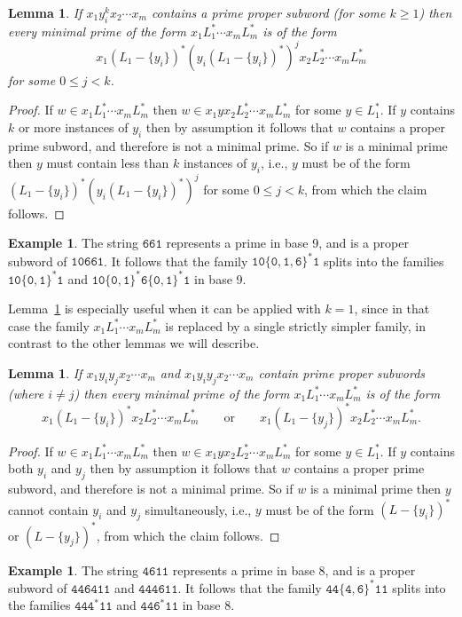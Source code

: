 \documentclass[12pt]{article}
\theoremstyle{plain}
\newtheorem{lemma}[theorem]{Lemma}
\theoremstyle{definition}
\newtheorem{example}[theorem]{Example}
\newcommand{\0}{\mathtt{0}}
\newcommand{\1}{\mathtt{1}}
\newcommand{\2}{\mathtt{2}}
\newcommand{\3}{\mathtt{3}}
\newcommand{\4}{\mathtt{4}}
\newcommand{\5}{\mathtt{5}}
\newcommand{\6}{\mathtt{6}}
\newcommand{\7}{\mathtt{7}}
\newcommand{\8}{\mathtt{8}}
\newcommand{\9}{\mathtt{9}}
\begin{document}
\begin{lemma}\label{lemsplit1}
If $x_1y_i^kx_2\dotsm x_m$ contains a prime proper subword (for some $k\geq1$) then every minimal prime of the form
$x_1L_1^*\dotsm x_mL_m^*$ is of the form \[x_1(L_1-\{y_i\})^*(y_i(L_1-\{y_i\})^*)^jx_2L_2^*\dotsm x_mL_m^*\]
for some $0\leq j<k$.
\end{lemma}
\begin{proof}
If $w\in x_1L_1^*\dotsm x_mL_m^*$ then $w\in x_1yx_2L_2^*\dotsm x_mL_m^*$ for some $y\in L_1^*$.
If $y$ contains $k$ or more instances of $y_i$ then by assumption it follows that $w$ contains a proper prime subword,
and therefore is not a minimal prime.  So if $w$ is a minimal prime then $y$ must contain less than $k$
instances of $y_i$, i.e., $y$ must be of the form $(L_1-\{y_i\})^*(y_i(L_1-\{y_i\})^*)^j$ for some $0\leq j<k$,
from which the claim follows.
\end{proof}
\begin{example}
The string $\6\6\1$ represents a prime in base 9, and is a proper subword of $\1\0\6\6\1$.  It follows that
the family $\1\0\{\0,\1,\6\}^*\1$ splits into the families
$\1\0\{\0,\1\}^*\1$ and $\1\0\{\0,\1\}^*\6\{\0,\1\}^*\1$ in base 9.
\end{example}

Lemma~\ref{lemsplit1} is especially useful when it can be applied with $k=1$, since in that case the family $x_1L_1^*\dotsm x_mL_m^*$
is replaced by a single strictly simpler family, in contrast to the other lemmas we will describe.

\begin{lemma}\label{lemsplit2}
If $x_1y_iy_jx_2\dotsm x_m$ and $x_1y_iy_jx_2\dotsm x_m$ contain prime proper subwords (where $i\neq j$) then 
every minimal prime of the form $x_1L_1^*\dotsm x_mL_m^*$ is of the form
\[x_1(L_1-\{y_i\})^*x_2L_2^*\dotsm x_mL_m^* \qquad\text{or}\qquad x_1(L_1-\{y_j\})^*x_2L_2^*\dotsm x_mL_m^* . \]
\end{lemma}
\begin{proof}
If $w\in x_1L_1^*\dotsm x_mL_m^*$ then $w\in x_1yx_2L_2^*\dotsm x_mL_m^*$ for some $y\in L_1^*$.
If $y$ contains both $y_i$ and $y_j$ then by assumption it follows that $w$ contains a proper prime subword,
and therefore is not a minimal prime.  So if $w$ is a minimal prime then $y$ cannot contain $y_i$ and $y_j$
simultaneously, i.e., $y$ must be of the form $(L-\{y_i\})^*$ or $(L-\{y_j\})^*$, from which the claim follows.
\end{proof}
\begin{example}
The string $\4\6\1\1$ represents a prime in base 8, and is a proper subword of $\4\4\6\4\1\1$ and $\4\4\4\6\1\1$.
It follows that the family $\4\4\{\4,\6\}^*\1\1$ splits into the families
$\4\4\4^*\1\1$ and $\4\4\6^*\1\1$ in base 8.
\end{example}
\end{document}
